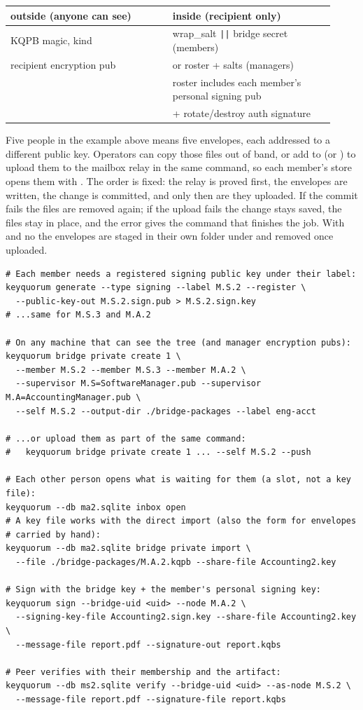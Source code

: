 \begin{center}
\begin{tabular}{@{}p{0.46\linewidth}p{0.46\linewidth}@{}}
\toprule
\textbf{outside (anyone can see)} & \textbf{inside (recipient only)} \\
\midrule
KQPB magic, kind & wrap\_salt \verb!||! bridge secret (members) \\
recipient encryption pub & or roster + salts (managers) \\
 & roster includes each member's personal signing pub \\
 & + rotate/destroy auth signature \\
\bottomrule
\end{tabular}
\end{center}

Five people in the example above means five envelopes, each addressed to a
different public key. Operators can copy those files out of band, or add
 to  (or ) to
upload them to the mailbox relay in the same command, so each member's store
opens them with . The order is fixed: the relay is
proved first, the envelopes are written, the change is committed, and only then
are they uploaded. If the commit fails the files are removed again; if the
upload fails the change stays saved, the files stay in place, and the error
gives the command that finishes the job. With  and no
 the envelopes are staged in their own folder under
 and removed once uploaded.

\begin{lstlisting}
# Each member needs a registered signing public key under their label:
keyquorum generate --type signing --label M.S.2 --register \
  --public-key-out M.S.2.sign.pub > M.S.2.sign.key
# ...same for M.S.3 and M.A.2

# On any machine that can see the tree (and manager encryption pubs):
keyquorum bridge private create 1 \
  --member M.S.2 --member M.S.3 --member M.A.2 \
  --supervisor M.S=SoftwareManager.pub --supervisor M.A=AccountingManager.pub \
  --self M.S.2 --output-dir ./bridge-packages --label eng-acct

# ...or upload them as part of the same command:
#   keyquorum bridge private create 1 ... --self M.S.2 --push

# Each other person opens what is waiting for them (a slot, not a key file):
keyquorum --db ma2.sqlite inbox open
# A key file works with the direct import (also the form for envelopes
# carried by hand):
keyquorum --db ma2.sqlite bridge private import \
  --file ./bridge-packages/M.A.2.kqpb --share-file Accounting2.key

# Sign with the bridge key + the member's personal signing key:
keyquorum sign --bridge-uid <uid> --node M.A.2 \
  --signing-key-file Accounting2.sign.key --share-file Accounting2.key \
  --message-file report.pdf --signature-out report.kqbs

# Peer verifies with their membership and the artifact:
keyquorum --db ms2.sqlite verify --bridge-uid <uid> --as-node M.S.2 \
  --message-file report.pdf --signature-file report.kqbs
\end{lstlisting}

